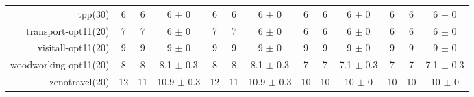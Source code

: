 \begin{center}
\begin{tabular}{|r|*{4}{ccc|}}
tpp(30) & 6 & 6 & 6 \(\pm\) 0 & 6 & 6 & 6 \(\pm\) 0 & 6 & 6 & 6 \(\pm\) 0 & 6 & 6 & 6 \(\pm\) 0\\
transport-opt11(20) & 7 & 7 & 6 \(\pm\) 0 & 7 & 7 & 6 \(\pm\) 0 & 6 & 6 & 6 \(\pm\) 0 & 6 & 6 & 6 \(\pm\) 0\\
visitall-opt11(20) & 9 & 9 & 9 \(\pm\) 0 & 9 & 9 & 9 \(\pm\) 0 & 9 & 9 & 9 \(\pm\) 0 & 9 & 9 & 9 \(\pm\) 0\\
woodworking-opt11(20) & 8 & 8 & 8.1 \(\pm\) 0.3 & 8 & 8 & 8.1 \(\pm\) 0.3 & 7 & 7 & 7.1 \(\pm\) 0.3 & 7 & 7 & 7.1 \(\pm\) 0.3\\
zenotravel(20) & 12 & 11 & 10.9 \(\pm\) 0.3 & 12 & 11 & 10.9 \(\pm\) 0.3 & 10 & 10 & 10 \(\pm\) 0 & 10 & 10 & 10 \(\pm\) 0\\
\end{tabular}
\end{center}
